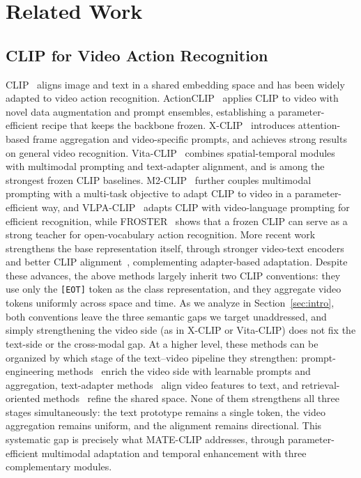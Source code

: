 \section{Related Work}
\label{sec:related}

\subsection{CLIP for Video Action Recognition}
CLIP~\cite{radford2021clip} aligns image and text in a shared embedding space and has been widely adapted to video action recognition.
ActionCLIP~\cite{wang2022actionclip} applies CLIP to video with novel data augmentation and prompt ensembles, establishing a parameter-efficient recipe that keeps the backbone frozen.
X-CLIP~\cite{ni2022xclip} introduces attention-based frame aggregation and video-specific prompts, and achieves strong results on general video recognition.
Vita-CLIP~\cite{wasim2023vitaclip} combines spatial-temporal modules with multimodal prompting and text-adapter alignment, and is among the strongest frozen CLIP baselines.
M2-CLIP~\cite{wang2024m2clip} further couples multimodal prompting with a multi-task objective to adapt CLIP to video in a parameter-efficient way, and VLPA-CLIP~\cite{wang2025vlpa} adapts CLIP with video-language prompting for efficient recognition, while FROSTER~\cite{ju2024froster} shows that a frozen CLIP can serve as a strong teacher for open-vocabulary action recognition.
More recent work strengthens the base representation itself, through stronger video-text encoders~\cite{wang2023internvideo,zhm2025siglip2} and better CLIP alignment~\cite{zhang2025alignclip}, complementing adapter-based adaptation.
Despite these advances, the above methods largely inherit two CLIP conventions: they use only the \texttt{[EOT]} token as the class representation, and they aggregate video tokens uniformly across space and time.
As we analyze in Section~\ref{sec:intro}, both conventions leave the three semantic gaps we target unaddressed, and simply strengthening the video side (as in X-CLIP or Vita-CLIP) does not fix the text-side or the cross-modal gap.
At a higher level, these methods can be organized by which stage of the text--video pipeline they strengthen: prompt-engineering methods~\cite{wang2022actionclip,ni2022xclip,wang2025vlpa} enrich the video side with learnable prompts and aggregation, text-adapter methods~\cite{wasim2023vitaclip} align video features to text, and retrieval-oriented methods~\cite{ju2021clip2video,xue2023clipvip} refine the shared space.
None of them strengthens all three stages simultaneously: the text prototype remains a single token, the video aggregation remains uniform, and the alignment remains directional.
This systematic gap is precisely what MATE-CLIP addresses, through parameter-efficient multimodal adaptation and temporal enhancement with three complementary modules.


